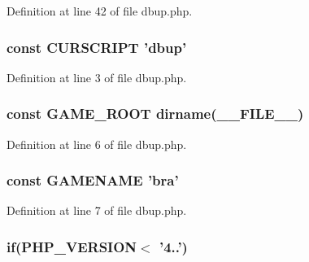 Definition at line 42 of file dbup.\+php.

\hypertarget{dbup_8php_a39c39f525eceb86cabc338804f230e80}{
\subsubsection[{C\+U\+R\+S\+C\+R\+I\+P\+T}]{\setlength{\rightskip}{0pt plus 5cm}const C\+U\+R\+S\+C\+R\+I\+P\+T 'dbup'}}\label{dbup_8php_a39c39f525eceb86cabc338804f230e80}


Definition at line 3 of file dbup.\+php.

\hypertarget{dbup_8php_a8e43cd27c8e744fff590983bc396aba3}{
\subsubsection[{G\+A\+M\+E\+\_\+\+R\+O\+O\+T}]{\setlength{\rightskip}{0pt plus 5cm}const G\+A\+M\+E\+\_\+\+R\+O\+O\+T dirname(\+\_\+\+\_\+\+F\+I\+L\+E\+\_\+\+\_\+)}}\label{dbup_8php_a8e43cd27c8e744fff590983bc396aba3}


Definition at line 6 of file dbup.\+php.

\hypertarget{dbup_8php_a3cd7223880b2f6a1d0bcb325ce43c606}{
\subsubsection[{G\+A\+M\+E\+N\+A\+M\+E}]{\setlength{\rightskip}{0pt plus 5cm}const G\+A\+M\+E\+N\+A\+M\+E 'bra'}}\label{dbup_8php_a3cd7223880b2f6a1d0bcb325ce43c606}


Definition at line 7 of file dbup.\+php.

\hypertarget{dbup_8php_a4ac1118c2e44c513a674bc1793ba6c90}{
\subsubsection[{if}]{\setlength{\rightskip}{0pt plus 5cm}if(P\+H\+P\+\_\+\+V\+E\+R\+S\+I\+O\+N$<$  '4..')}}\label{dbup_8php_a4ac1118c2e44c513a674bc1793ba6c90}


